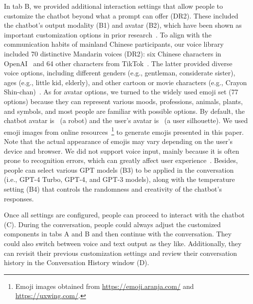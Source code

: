 In tab B, we provided additional interaction settings that allow people to customize the chatbot beyond what a prompt can offer (DR2).
These included the chatbot's output modality (B1) and avatar (B2), which have been shown as important customization options in prior research~\cite{Feine2019Taxonomy}. 
To align with the communication habits of mainland Chinese participants, our voice library included 70 distinctive Mandarin voices (DR2): six Chinese characters in OpenAI~\cite{openai} and 64 other characters from TikTok~\cite{tiktok}. The latter provided diverse voice options, including different genders (e.g., gentleman, considerate sister), ages (e.g., little kid, elderly), and other cartoon or movie characters (e.g., Crayon Shin-chan)~\cite{tiktok}.
As for avatar options, we turned to the widely used emoji set (77 options) because they can represent various moods, professions, animals, plants, and symbols, and most people are familiar with possible options. By default, the chatbot avatar is~ (a robot) and the user's avatar is~ (a user silhouette).  We used emoji images from online resources~\footnote{Emoji images obtained from \url{https://emoji.aranja.com/} and \url{https://uxwing.com/}.} to generate emojis presented in this paper. Note that the actual appearance of emojis may vary depending on the user's device and browser.
We did not support voice input, mainly because it is often prone to recognition errors, which can greatly affect user experience~\cite{luo2022notewordy}.
Besides, people can select various GPT models (B3) to be applied in the conversation (i.e., GPT-4 Turbo, GPT-4, and GPT-3 models), along with the temperature setting (B4) that controls the randomness and creativity of the chatbot's responses.

Once all settings are configured, people can proceed to interact with the chatbot (C). 
During the conversation, people could always adjust the customized components in tabs A and B and then continue with the conversation. They could also switch between voice and text output as they like. Additionally, they can revisit their previous customization settings and review their conversation history in the Conversation History window (D).

